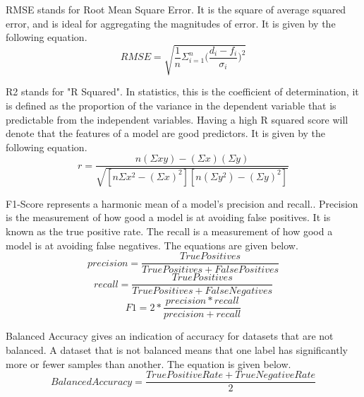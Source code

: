 \par
RMSE stands for Root Mean Square Error.
It is the square of average squared error, and is ideal for aggregating the magnitudes of error.
It is given by the following equation.
\begin{equation}
    RMSE = \sqrt{\frac{1}{n}\Sigma_{i=1}^{n}{\Big(\frac{d_i -f_i}{\sigma_i}\Big)^2}}
\end{equation}

\par
R2 stands for "R Squared".
In statistics, this is the coefficient of determination, it is defined as the proportion of the variance in the dependent variable that is predictable from the independent variables.
Having a high R squared score will denote that the features of a model are good predictors.
It is given by the following equation.
\begin{equation}
    r = \frac{n(\Sigma x y)-(\Sigma x)(\Sigma y)}{\sqrt{[n \Sigma x^2  - (\Sigma x)^2][n(\Sigma y^2) - (\Sigma y)^2]}}
\end{equation}

\par
F1-Score represents a harmonic mean of a model's precision and recall..
Precision is the measurement of how good a model is at avoiding false positives.
It is known as the true positive rate.
The recall is a measurement of how good a model is at avoiding false negatives.
The equations are given below.
\begin{equation}
    precision = \frac{True Positives}{True Positives + False Positives}
\end{equation}
\begin{equation}
    recall = \frac{True Positives}{True Positives + False Negatives}
\end{equation}
\begin{equation}
    F1 = 2 * \frac{precision * recall}{precision + recall}
\end{equation}

\par
Balanced Accuracy gives an indication of accuracy for datasets that are not balanced.
A dataset that is not balanced means that one label has significantly more or fewer samples than another.
The equation is given below.
\begin{equation}
    Balanced\! Accuracy = \frac{True Positive Rate + True Negative Rate}{2}
\end{equation}





